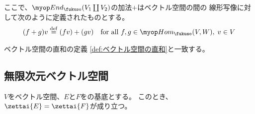 	ここで、$\End_\fukuso(V_1\coprod V_2)$の加法$+$はベクトル空間の間の
	線形写像に対して次のように定義されたものとする。
	\begin{equation*}\begin{split} %
		(f+g)v \defeq (fv) + (gv)
		\quad\text{for all }f,g\in\Hom_\fukuso(V,W),\;v\in V
	\end{split}\end{equation*} %

	ベクトル空間の直和の定義
	\ref{def:ベクトル空間の直和}と一致する。

\subsection{無限次元ベクトル空間}\label{s2:無限次元ベクトル空間} %
	\begin{proposition}[ベクトル空間の次元定理]\label{prop:ベクトル空間の次元定理} %
		$V$をベクトル空間、$E$と$F$をの基底とする。
		このとき、$\zettai{E}=\zettai{F}$が成り立つ。
	\end{proposition} %
